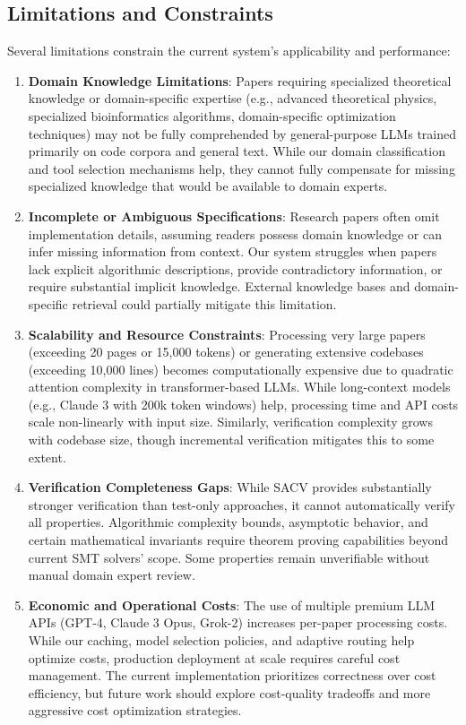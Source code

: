 \documentclass{ieeeaccess}
\begin{document}
\subsection{Limitations and Constraints}
Several limitations constrain the current system's applicability and performance:

\begin{enumerate}
\item \textbf{Domain Knowledge Limitations}: Papers requiring specialized theoretical knowledge or domain-specific expertise (e.g., advanced theoretical physics, specialized bioinformatics algorithms, domain-specific optimization techniques) may not be fully comprehended by general-purpose LLMs trained primarily on code corpora and general text. While our domain classification and tool selection mechanisms help, they cannot fully compensate for missing specialized knowledge that would be available to domain experts.

\item \textbf{Incomplete or Ambiguous Specifications}: Research papers often omit implementation details, assuming readers possess domain knowledge or can infer missing information from context. Our system struggles when papers lack explicit algorithmic descriptions, provide contradictory information, or require substantial implicit knowledge. External knowledge bases and domain-specific retrieval could partially mitigate this limitation.

\item \textbf{Scalability and Resource Constraints}: Processing very large papers (exceeding 20 pages or 15,000 tokens) or generating extensive codebases (exceeding 10,000 lines) becomes computationally expensive due to quadratic attention complexity in transformer-based LLMs. While long-context models (e.g., Claude 3 with 200k token windows) help, processing time and API costs scale non-linearly with input size. Similarly, verification complexity grows with codebase size, though incremental verification mitigates this to some extent.

\item \textbf{Verification Completeness Gaps}: While SACV provides substantially stronger verification than test-only approaches, it cannot automatically verify all properties. Algorithmic complexity bounds, asymptotic behavior, and certain mathematical invariants require theorem proving capabilities beyond current SMT solvers' scope. Some properties remain unverifiable without manual domain expert review.

\item \textbf{Economic and Operational Costs}: The use of multiple premium LLM APIs (GPT-4, Claude 3 Opus, Grok-2) increases per-paper processing costs. While our caching, model selection policies, and adaptive routing help optimize costs, production deployment at scale requires careful cost management. The current implementation prioritizes correctness over cost efficiency, but future work should explore cost-quality tradeoffs and more aggressive cost optimization strategies.
\end{enumerate}
\end{document}
